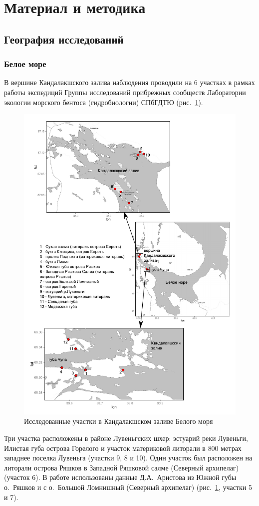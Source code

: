 \section{Материал и методика}
	\subsection{География исследований}

		\subsubsection{Белое море}
В вершине Кандалакшского залива наблюдения проводили на $6$ участках в рамках работы экспедиций Группы исследований прибрежных сообществ Лаборатории экологии морского бентоса (гидробиологии) СПбГДТЮ (рис.~\ref{ris:karta_White}). 
	\begin{figure}
    \includegraphics[width=\textwidth]{../maps/White_sea1.pdf}
    \caption{Исследованные участки в Кандалакшском заливе Белого моря}
    \label{ris:karta_White}
	\end{figure}
Три участка расположены в районе Лувеньгских шхер: эстуарий реки Лувеньги, Илистая губа острова Горелого и участок материковой литорали в $800$ метрах западнее поселка Лувеньга (участки 9, 8 и 10).
Один участок был расположен на литорали острова Ряшков в Западной Ряшковой салме (Северный архипелаг) (участок 6).
В работе использованы данные Д.\:А.~Аристова из Южной губы о.~Ряшков и с о.~Большой Ломнишный (Северный архипелаг) (рис.~\ref{ris:karta_White}, участки 5 и 7). 

